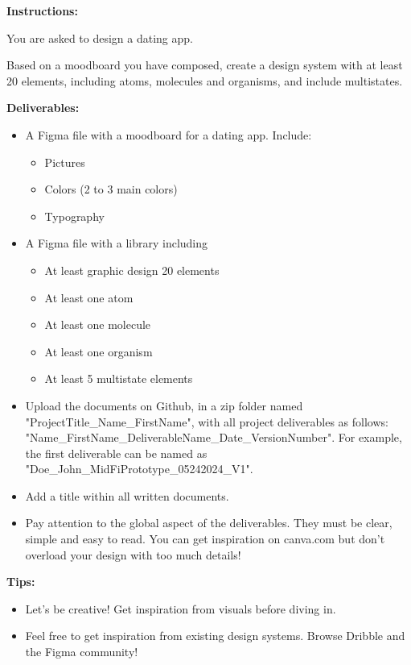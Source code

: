 \makeheaderfiles

\textbf{Instructions:}

You are asked to design a dating app.

Based on a moodboard you have composed, create a design system with at least 20 elements, including atoms, molecules and organisms, and include multistates.

\textbf{Deliverables:}

\begin{itemize}
\item A Figma file with a moodboard for a dating app. Include:
\begin{itemize}
\item Pictures
\item Colors (2 to 3 main colors)
\item Typography
\end{itemize}
\item A Figma file with a library including
\begin{itemize}
\item At least graphic design 20 elements
\item At least one atom
\item At least one molecule
\item At least one organism
\item At least 5 multistate elements
\end{itemize}
\item Upload the documents on Github, in a zip folder named "ProjectTitle\_Name\_FirstName", with all project deliverables as follows: "Name\_FirstName\_DeliverableName\_Date\_VersionNumber".  For example, the first deliverable can be named as "Doe\_John\_MidFiPrototype\_05242024\_V1".
\item Add a title within all written documents.
\item Pay attention to the global aspect of the deliverables. They must be clear, simple and easy to read. You can get inspiration on canva.com but don't overload your design with too much details!
\end{itemize}

\textbf{Tips:}

\begin{itemize}
\item Let's be creative! Get inspiration from visuals before diving in.
\item Feel free to get inspiration from existing design systems. Browse Dribble and the Figma community!
\end{itemize}

